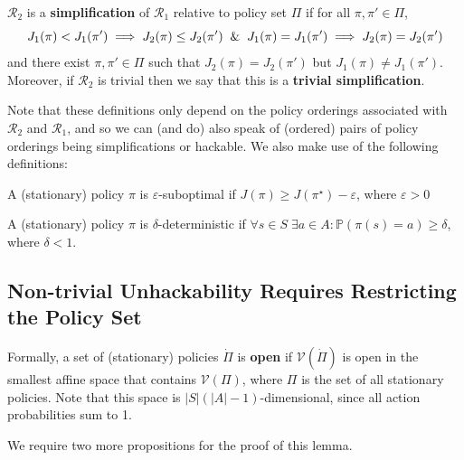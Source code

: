 \begin{definition}
$\mathcal{R}_2$ is a \textbf{simplification} of $\mathcal{R}_1$ relative to policy set $\Pi$ if for all $\pi,\pi' \in \Pi$, 
$$
J_1(\pi) < J_1(\pi') \implies J_2(\pi) \leq J_2(\pi') 
\And 
J_1(\pi) = J_1(\pi') \implies J_2(\pi) = J_2(\pi')
$$
and there exist $\pi,\pi' \in \Pi$ such that $J_2(\pi) = J_2(\pi')$ but $J_1(\pi) \neq J_1(\pi')$. Moreover, if $\mathcal{R}_2$ is trivial
then we say that this is a \textbf{trivial simplification}.
\end{definition}

Note that these definitions only depend on the policy orderings associated with $\mathcal{R}_2$ and $\mathcal{R}_1$, and so we can (and do) also speak of (ordered) pairs of policy orderings being simplifications or hackable. We also make use of the following definitions:


\begin{definition}
A (stationary) policy $\pi$ is $\varepsilon$-suboptimal if $J(\pi) \geq J(\pi^\star) - \varepsilon$, where $\varepsilon > 0$
\end{definition}

\begin{definition}
A (stationary) policy $\pi$ is $\delta$-deterministic if $\forall s \in S \; \exists a \in A: \mathbb{P}(\pi(s) = a) \geq \delta$, where $\delta < 1$.
\end{definition}



\subsection{Non-trivial Unhackability Requires Restricting the Policy Set}\label{app:results_all}

Formally, a set of (stationary) policies $\dot{\Pi}$ is \textbf{open} if $\mathcal{V}(\dot{\Pi})$ is open in the smallest affine space that contains $\mathcal{V}(\Pi)$, where $\Pi$ is the set of all stationary policies. Note that this space is $|S|(|A|-1)$-dimensional, since all action probabilities sum to 1.

We require two more propositions for the proof of this lemma.

